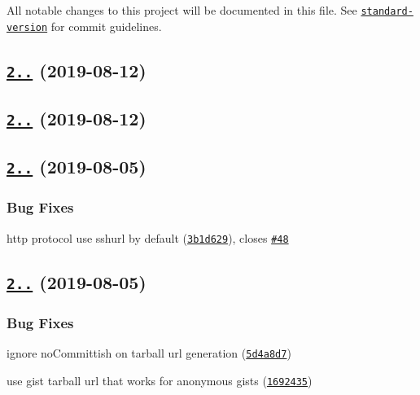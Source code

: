 All notable changes to this project will be documented in this file. See \href{https://github.com/conventional-changelog/standard-version}{\tt standard-\/version} for commit guidelines.

\label{_2.8.4}%
 \subsection*{\href{https://github.com/npm/hosted-git-info/compare/v2.8.3...v2.8.4}{\tt 2..} (2019-\/08-\/12)}

\label{_2.8.3}%
 \subsection*{\href{https://github.com/npm/hosted-git-info/compare/v2.8.2...v2.8.3}{\tt 2..} (2019-\/08-\/12)}

\label{_2.8.2}%
 \subsection*{\href{https://github.com/npm/hosted-git-info/compare/v2.8.1...v2.8.2}{\tt 2..} (2019-\/08-\/05)}

\subsubsection*{Bug Fixes}


\begin{DoxyItemize}
\item http protocol use sshurl by default (\href{https://github.com/npm/hosted-git-info/commit/3b1d629}{\tt 3b1d629}), closes \href{https://github.com/npm/hosted-git-info/issues/48}{\tt \#48}
\end{DoxyItemize}

\label{_2.8.1}%
 \subsection*{\href{https://github.com/npm/hosted-git-info/compare/v2.8.0...v2.8.1}{\tt 2..} (2019-\/08-\/05)}

\subsubsection*{Bug Fixes}


\begin{DoxyItemize}
\item ignore no\+Committish on tarball url generation (\href{https://github.com/npm/hosted-git-info/commit/5d4a8d7}{\tt 5d4a8d7})
\item use gist tarball url that works for anonymous gists (\href{https://github.com/npm/hosted-git-info/commit/1692435}{\tt 1692435})
\end{DoxyItemize}

